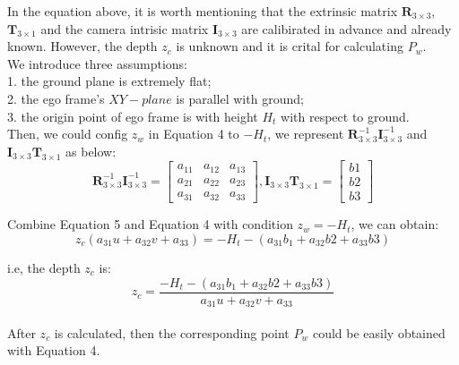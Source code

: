 \documentclass[
	letterpaper,
	10pt, 
]{CSUniSchoolLabReport}
\begin{document}
In the equation above, it is worth mentioning that the extrinsic matrix $\bm{R}_{3\times 3}$, 
$\bm{T}_{3\times 1}$ and the camera intrisic matrix $\bm{I}_{3\times 3}$ are calibirated in advance and already known. However, the depth $z_c$ is unknown and it is crital for calculating $P_w$. \\

We introduce three assumptions:\\
1. the ground plane is extremely flat; \\
2. the ego frame's $XY-plane$ is parallel with ground; \\
3. the origin point of ego frame is with height $H_t$ with respect to ground. \\

Then, we could config $z_w$ in Equation 4 to $-H_t$, we represent $\bm{R}^{-1}_{3\times 3}\bm{I}^{-1}_{3\times 3}$ and $\bm{I}_{3\times 3}\bm{T}_{3\times 1}$ as below:
\begin{equation}
\bm{R}^{-1}_{3\times 3}\bm{I}^{-1}_{3\times 3} = \begin{bmatrix}
a_{11} & a_{12} & a_{13} \\
a_{21} & a_{22} & a_{23} \\
a_{31} & a_{32} & a_{33} 
\end{bmatrix}, \bm{I}_{3\times 3}\bm{T}_{3\times 1} = \begin{bmatrix}
b1 \\
b2 \\
b3
\end{bmatrix}
\end{equation}

Combine Equation 5 and Equation 4 with condition $z_w = -H_t$, we can obtain:
\begin{equation}
z_c(a_{31}u + a_{32}v + a_{33}) = -H_t - (a_{31} b_1 + a_{32} b2 + a_{33} b3)
\end{equation} 

i.e, the depth $z_c$ is:
\begin{equation}
z_c = \frac{-H_t - (a_{31} b_1 + a_{32} b2 + a_{33} b3)}{a_{31}u + a_{32}v + a_{33}}
\end{equation} \\

After $z_c$ is calculated, then the corresponding point $P_w$ could be easily obtained with Equation 4.
\end{document}
